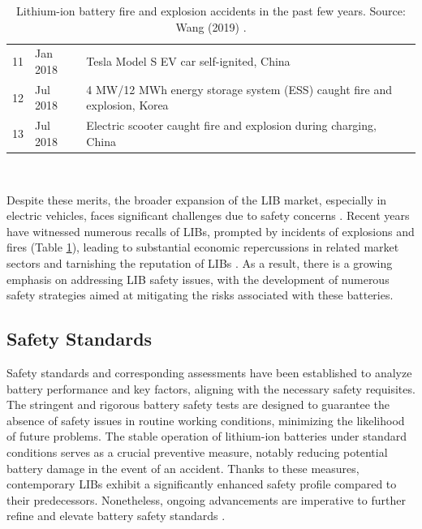 \begin{table}[ht]
\begin{footnotesize}
\begin{tabular}{|p{7mm} p{22mm} p{113mm}|}
                11 & Jan 2018 & Tesla Model S EV car self-ignited, China\T\B\\
                12 & Jul 2018 & 4 MW/12 MWh energy storage system (ESS) caught fire and explosion, Korea\T\B\\
                13 & Jul 2018 & Electric scooter caught fire and explosion during charging, China\T\B\\
                \hline
                \end{tabular}
                \\[10pt]
                \caption[Lithium-ion battery accidents]{Lithium-ion battery fire and explosion accidents in the past few years. Source: Wang (2019) \cite{wang2019review}.}
                \label{table:accidents}
        \end{footnotesize}
\end{table}

Despite these merits, the broader expansion of the LIB market, especially in electric vehicles, faces significant challenges due to safety concerns \cite{love2018innovating,schipper2016recent,feng2018thermal}. Recent years have witnessed numerous recalls of LIBs, prompted by incidents of explosions and fires (Table \ref{table:accidents}), leading to substantial economic repercussions in related market sectors and tarnishing the reputation of LIBs \cite{chen2021review,balakrishnan2006safety}. As a result, there is a growing emphasis on addressing LIB safety issues, with the development of numerous safety strategies aimed at mitigating the risks associated with these batteries.

\subsection{Safety Standards}
\label{sec:safety-standards}

Safety standards and corresponding assessments have been established to analyze battery performance and key factors, aligning with the necessary safety requisites. The stringent and rigorous battery safety tests are designed to guarantee the absence of safety issues in routine working conditions, minimizing the likelihood of future problems. The stable operation of lithium-ion batteries under standard conditions serves as a crucial preventive measure, notably reducing potential battery damage in the event of an accident. Thanks to these measures, contemporary LIBs exhibit a significantly enhanced safety profile compared to their predecessors. Nonetheless, ongoing advancements are imperative to further refine and elevate battery safety standards \cite{chen2021review}.

